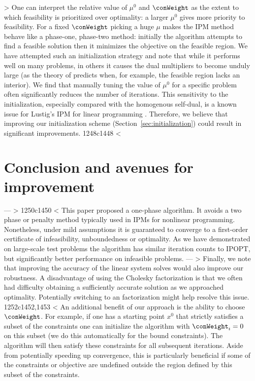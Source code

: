 > One can interpret the relative value of $\mu^0$ and $\conWeight$ as the extent to which feasibility is prioritized over optimality: a larger $\mu^0$ gives more priority to feasibility. For a fixed $\conWeight$ picking a huge $\mu$ makes the IPM method behave like a phase-one, phase-two method: initially the algorithm attempts to find a feasible solution then it minimizes the objective on the feasible region. We have attempted such an initialization strategy and note that while it performs well on many problems, in others it causes the dual multipliers to become unduly large (as the theory of \cite{haeser2017behavior} predicts when, for example, the feasible region lacks an interior). We find that manually tuning the value of $\mu^0$ for a specific problem often significantly reduces the number of iterations. This sensitivity to the initialization, especially compared with the homogenous self-dual, is a known issue for Lustig's IPM for linear programming \cite[Table 1]{meszaros2015practical}. Therefore, we believe that improving our initialization scheme (Section~\ref{sec:initialization}) could result in significant improvements.
1248c1448
< \section{Conclusion and avenues for improvement}
---
> %
1250c1450
< This paper proposed a one-phase algorithm. It avoids a two phase or penalty method typically used in IPMs for nonlinear programming. Nonetheless, under mild assumptions it is guaranteed to converge to a first-order certificate of infeasibility, unboundedness or optimality. As we have demonstrated on large-scale test problems the algorithm has similar iteration counts to IPOPT, but significantly better performance on infeasible problems. 
---
> Finally, we note that improving the accuracy of the linear system solves would also improve our robustness. A disadvantage of using the Cholesky factorization is that we often had difficulty obtaining a sufficiently accurate solution as we approached optimality. Potentially switching to an \LBL{} factorization \cite{amestoy1998mumps,bunch1971direct} might help resolve this issue.
1252c1452,1453
< An additional benefit of our approach is the ability to choose $\conWeight$. For example, if one has a starting point $x^0$ that strictly satisfies a subset of the constraints one can initialize the algorithm with $\conWeight_i = 0$ on this subset (we do this automatically for the bound constraints). The algorithm will then satisfy these constraints for all subsequent iterations. Aside from potentially speeding up convergence, this is particularly beneficial if some of the constraints or objective are undefined outside the region defined by this subset of the constraints.
